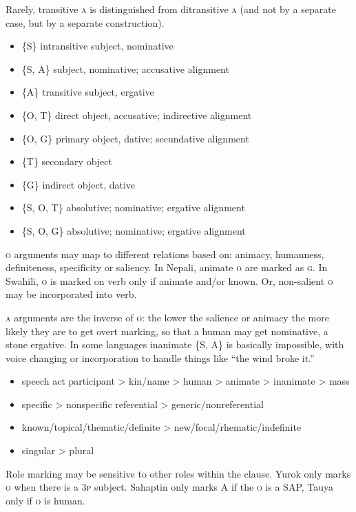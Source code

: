 \documentclass[11pt]{article}
\newcommand{\I}[1]{\textsc{#1}}   %
\newenvironment{grammarlist}%
 {\begin{itemize}\addtolength{\itemsep}{-0.5\baselineskip}\ignorespaces}%
 {\end{itemize}\ignorespacesafterend}
\begin{document}
{Rarely, transitive \I{a} is distinguished from ditransitive \I{a} (and
not by a separate case, but by a separate construction).

\begin{grammarlist}
  \item \{\I{S}\} intransitive subject, nominative
  \item \{\I{S, A}\} subject, nominative; accusative alignment
  \item \{\I{A}\} transitive subject, ergative
  \item \{\I{O, T}\} direct object, accusative; indirective alignment
  \item \{\I{O, G}\} primary object, dative; secundative alignment
  \item \{\I{T}\} secondary object
  \item \{\I{G}\} indirect object, dative
  \item \{\I{S, O, T}\} absolutive; nominative; ergative alignment
  \item \{\I{S, O, G}\} absolutive; nominative; ergative alignment
\end{grammarlist}

\I{o} arguments may map to different relations based on: animacy,
humanness, definiteness, specificity or saliency.  In Nepali, animate
\I{o} are marked as \I{g}.  In Swahili, \I{o} is marked on verb only
if animate and/or known.  Or, non-salient \I{o} may be incorporated
into verb.

\I{a} arguments are the inverse of \I{o}: the lower the salience or
animacy the more likely they are to get overt marking, so that a human
may get nominative, a stone ergative.  In some languages inanimate
\{\I{S, A}\} is basically impossible, with voice changing or
incorporation to handle things like ``the wind broke it.''

\begin{grammarlist}
  \item speech act participant > kin/name > human > animate >
    inanimate > mass
  \item specific > nonspecific referential > generic/nonreferential
  \item known/topical/thematic/definite > new/focal/rhematic/indefinite
  \item singular > plural
\end{grammarlist}

Role marking may be sensitive to other roles within the clause.  Yurok
only marks \I{o} when there is a \I{3p} subject.  Sahaptin only marks
\I{A} if the \I{o} is a SAP, Tauya only if \I{o} is human.

}
\end{document}
